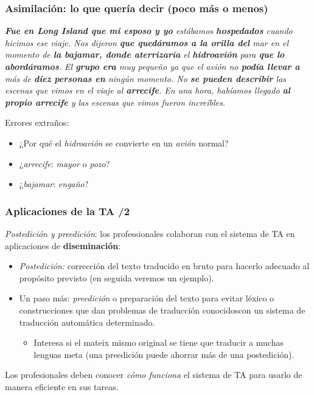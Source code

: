 \documentclass{beamer}
\newcommand{\empha}[1]{\emph{#1}\/}
\begin{document}
\begin{frame}
  \frametitle{Asimilación: lo que quería decir (poco más o menos)}

\empha{\textbf{Fue en Long Island que mi esposo y yo} estábamos \textbf{hospedados} cuando hicimos ese viaje. Nos dijeron \textbf{que quedáramos a la orilla del} mar en el momento de \textbf{la bajamar, donde aterrizaría}  el \textbf{hidroavión} para \textbf{que lo abordáramos}. El \textbf{grupo era} muy pequeño ya que el avión no \textbf{podía llevar a} más de \textbf{diez personas en} ningún momento. No \textbf{se pueden describir} las escenas que vimos en el viaje al \textbf{arrecife}. En una hora, habíamos llegado \textbf{al propio arrecife} y las escenas que vimos fueron increíbles.}

Errores extraños:
\begin{itemize}
\item ¿Por qué el \empha{hidroavión} se convierte en un \empha{avión} normal?
\item ¿\empha{arrecife}:  \empha{mayor} o \empha{pozo}?
\item ¿\empha{bajamar}: \empha{engaño}?
\end{itemize}

\end{frame}



\begin{frame}
\frametitle{Aplicaciones de la TA /2}

\empha{Postedición y preedición}: los professionales colaboran con el
  sistema de TA en aplicaciones de \textbf{diseminación}:
\begin{itemize}
\item\empha{Postedición:} corrección del texto traducido en bruto para hacerlo adecuado al propósito previsto (en seguida veremos un ejemplo).
\item Un paso más: \empha{preedición} o preparación del texto para evitar
  léxico o construcciones que dan problemas de traducción conocidoscon un
  sistema de traducción automática determinado. 
  \begin{itemize}
  \item Interesa si el mateix mismo original se tiene que traducir a muchas lenguas meta (una preedición puede ahorrar más de una postedición).

  \end{itemize}
\end{itemize}

  Los profesionales deben conocer \empha{cómo funciona} el sistema de TA para usarlo de manera eficiente en sus tareas.

\end{frame}
\end{document}

